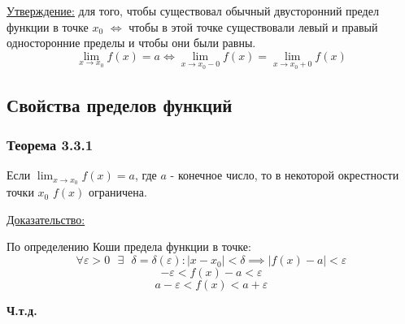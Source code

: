 \documentclass[12pt]{article}
\let\ORIincludegraphics\includegraphics
\renewcommand{\includegraphics}[2][]{\ORIincludegraphics[scale=0.65,#1]{#2}}
\begin{document}
    \underline{Утверждение:} для того, чтобы существовал обычный двусторонний предел функции в точке $x_0$ $\Longleftrightarrow$ чтобы в этой точке существовали левый и правый односторонние пределы и чтобы они были равны.
    \[ \lim_{x \to x_0} f(x) = a \Longleftrightarrow \lim_{x \to x_0 - 0}f(x) = \lim_{x \to x_0 + 0} f(x) \]

    \subsection{Свойства пределов функций}
    \subsubsection*{Теорема 3.3.1}\label{th:3.3.1}
    Если $\lim_{x\to x_0}f(x) = a$, где $a$ - конечное число, то в некоторой окрестности точки $x_0$ $f(x)$ ограничена.\par\noindent
    \underline{Доказательство:}
    \begin{adjustwidth}{1.5em}{1.5em}
        По определению Коши предела функции в точке:
        \[ \forall \varepsilon > 0 \text{ } \exists \text{ } \delta = \delta(\varepsilon) : |x - x_0| < \delta \implies |f(x) - a| < \varepsilon \]
        \[ -\varepsilon < f(x) - a < \varepsilon \]
        \[ a - \varepsilon < f(x) < a + \varepsilon \]
        \begin{center}
            \textbf{Ч.т.д.}
        \end{center}
    \end{adjustwidth}
\end{document}
